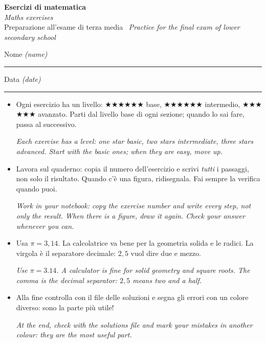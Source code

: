 \documentclass[11pt,a4paper]{article}
\newcommand{\en}[1]{\par{\small\itshape\color{engray}#1\par}}
\newcommand{\enx}[1]{{\small\itshape\color{engray}(#1)}}
\newcommand{\stella}[1]{\textcolor{#1}{$\bigstar$}}
\newcommand{\livello}[1]{%
  \ifcase#1\or\stella{lv1}\or\stella{lv2}\stella{lv2}\or\stella{lv3}\stella{lv3}\stella{lv3}\fi}
\newcounter{sezione}
\begin{document}
\begin{center}
{\LARGE\bfseries\color{navy} Esercizi di matematica}\\[3pt]
{\large\itshape\color{engray} Maths exercises}\\[6pt]
{\normalsize Preparazione all'esame di terza media \textperiodcentered\ \textit{\color{engray}Practice for the final exam of lower secondary school}}
\end{center}
\vspace{2pt}
\noindent Nome \enx{name}\ \rule{6cm}{0.4pt}\hfill Data \enx{date}\ \rule{3.5cm}{0.4pt}

\begin{tcolorbox}[colback=navy!4, colframe=navy!50, boxrule=0.5pt, arc=2pt, left=6pt, right=6pt, top=4pt, bottom=4pt,
  title={Come lavorare \textperiodcentered\ \itshape How to work}, fonttitle=\bfseries\small, colbacktitle=navy!70]
\begin{itemize}[leftmargin=1.2em]
\item Ogni esercizio ha un livello: \livello{1} base, \livello{2} intermedio, \livello{3} avanzato. Parti dal livello base di ogni sezione; quando lo sai fare, passa al successivo.
\en{Each exercise has a level: one star basic, two stars intermediate, three stars advanced. Start with the basic ones; when they are easy, move up.}
\item Lavora sul quaderno: copia il numero dell'esercizio e scrivi \emph{tutti} i passaggi, non solo il risultato. Quando c'è una figura, ridisegnala. Fai sempre la verifica quando puoi.
\en{Work in your notebook: copy the exercise number and write every step, not only the result. When there is a figure, draw it again. Check your answer whenever you can.}
\item Usa $\pi=3,14$. La calcolatrice va bene per la geometria solida e le radici. La virgola è il separatore decimale: $2,5$ vuol dire due e mezzo.
\en{Use $\pi = 3.14$. A calculator is fine for solid geometry and square roots. The comma is the decimal separator: $2,5$ means two and a half.}
\item Alla fine controlla con il file delle soluzioni e segna gli errori con un colore diverso: sono la parte più utile!
\en{At the end, check with the solutions file and mark your mistakes in another colour: they are the most useful part.}
\end{itemize}
\end{tcolorbox}
\end{document}
